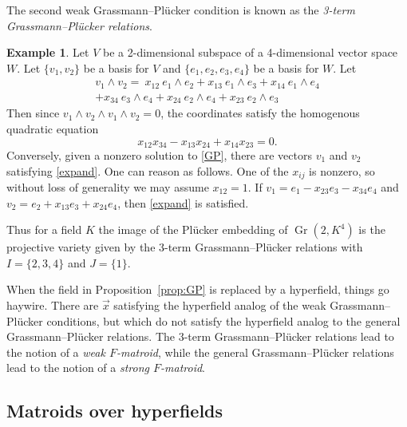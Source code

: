 \documentclass[10pt, preprint]{article}
\theoremstyle{definition}
\newtheorem{example}[theorem]{Example}
\begin{document}
The second weak Grassmann--Pl\"{u}cker condition is known as the
\emph{3-term Grassmann--Pl\"{u}cker relations}.\vspace*{-1pt}
%
\begin{example}
Let $V$ be a 2-dimensional subspace of a 4-dimensional vector space
$W$. Let $\{v_{1},v_{2}\}$ be a basis for $V$ and $\{e_{1},e_{2},e
_{3},e_{4}\}$ be a basis for $W$. Let\vspace*{-1pt}
%
\begin{align}
\label{expand}
v_{1} \wedge v_{2} = \ x_{12}\ e_{1} \wedge e_{2} + x_{13}\ e_{1}
\wedge e_{3} + x_{14}\ e_{1} \wedge e_{4}
\nonumber
\\[-1pt]
+x_{34}\ e_{3} \wedge e_{4} + x_{24}\ e_{2} \wedge e_{4} + x_{23}\ e
_{2} \wedge e_{3}
\end{align}
%
Then since $v_{1} \wedge v_{2} \wedge v_{1} \wedge v_{2} =0$, the
coordinates satisfy the homogenous quadratic equation\vspace*{-1pt}
%
\begin{equation}
\label{GP}
x_{12}x_{34} - x_{13}x_{24} + x_{14}x_{23} = 0.
\end{equation}
%
Conversely, given a nonzero solution to \eqref{GP}, there are vectors
$v_{1}$ and $v_{2}$ satisfying \eqref{expand}. One can reason as
follows. One of the $x_{ij}$ is nonzero, so without loss of generality
we may assume $x_{12} = 1$. If $v_{1} = e_{1} - x_{23}e_{3} - x_{34}e
_{4}$ and $v_{2} = e_{2} + x_{13}e_{3} + x_{24}e_{4}$, then \eqref{expand} is satisfied.

Thus for a field $K$ the image of the Pl\"{u}cker embedding of
$\operatorname{Gr}(2, K^{4})$ is the projective variety given by the
3-term Grassmann--Pl\"{u}cker relations with $I=\{2,3,4\}$ and
$J=\{1\}$.\vspace*{-2pt}
\end{example}

When the field in Proposition~\ref{prop:GP} is replaced by a hyperfield,
things go haywire. There are $\vec{x}$ satisfying the hyperfield analog
of the weak Grassmann--Pl\"{u}cker conditions, but which do not satisfy
the hyperfield analog to the general Grassmann--Pl\"{u}cker relations.
The 3-term Grassmann--Pl\"{u}cker relations lead to the notion of a
\emph{weak $F$-matroid}, while the general Grassmann--Pl\"{u}cker
relations lead to the notion of a \emph{strong $F$-matroid}.\vspace*{-2pt}

\subsection{Matroids over hyperfields}%
\label{sec:defn}
\end{document}
